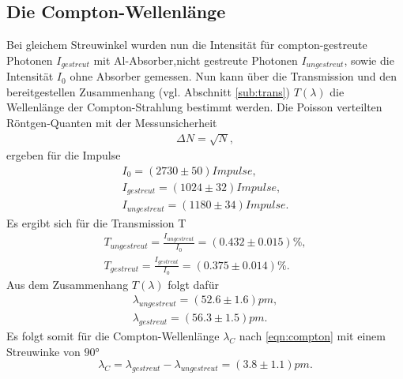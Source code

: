 \subsection{Die Compton-Wellenlänge}
Bei gleichem Streuwinkel wurden nun die Intensität für compton-gestreute Photonen
$I_{gestreut}$ mit Al-Absorber,nicht gestreute Photonen $I_{ungestreut}$, sowie 
die Intensität $I_0$ ohne Absorber gemessen.
Nun kann über die Transmission und den bereitgestellen Zusammenhang (vgl. Abschnitt \ref{sub:trans})
$T(\lambda)$ die Wellenlänge der Compton-Strahlung bestimmt werden.
Die Poisson verteilten Röntgen-Quanten mit der Messunsicherheit\\
\begin{align*}
    \Delta N= \sqrt{N},
\end{align*}
ergeben für die Impulse
\begin{align*}
    I_0=(2730\pm50)\si{Impulse},\\
    I_{gestreut}=(1024\pm32)\si{Impulse},\\
    I_{ungestreut}=(1180\pm34)\si{Impulse}.
\end{align*}
Es ergibt sich für die Transmission T
\begin{align*}
    T_{ungestreut}=\frac{I_{ungestreut}}{I_{0}}=(0.432\pm0.015)\%,\\
    T_{gestreut}=\frac{I_{gestreut}}{I_{0}}=(0.375\pm0.014)\%.
\end{align*}
Aus dem Zusammenhang $T(\lambda)$ folgt dafür
\begin{align*}
    \lambda_{ungestreut}=(52.6\pm1.6)\si{pm},\\
    \lambda_{gestreut}=(56.3\pm1.5)\si{pm}.
\end{align*}
Es folgt somit für die Compton-Wellenlänge $\lambda_C$ nach \ref{eqn:compton} mit
einem Streuwinke von $90$°
\begin{equation*}
    \lambda_C=\lambda_{gestreut}-\lambda_{ungestreut}=(3.8\pm1.1)\si{pm}.
\end{equation*}
\label{sec:Auswertung}
